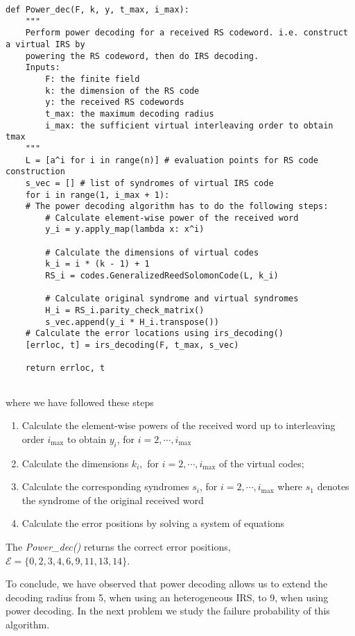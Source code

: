 \documentclass{article}
\begin{document}
\begin{verbatim}
def Power_dec(F, k, y, t_max, i_max):
    """
    Perform power decoding for a received RS codeword. i.e. construct a virtual IRS by
    powering the RS codeword, then do IRS decoding.
    Inputs:
        F: the finite field
        k: the dimension of the RS code
        y: the received RS codewords
        t_max: the maximum decoding radius
        i_max: the sufficient virtual interleaving order to obtain tmax
    """
    L = [a^i for i in range(n)] # evaluation points for RS code construction
    s_vec = [] # list of syndromes of virtual IRS code
    for i in range(1, i_max + 1):
    # The power decoding algorithm has to do the following steps:
        # Calculate element-wise power of the received word
        y_i = y.apply_map(lambda x: x^i)

        # Calculate the dimensions of virtual codes
        k_i = i * (k - 1) + 1
        RS_i = codes.GeneralizedReedSolomonCode(L, k_i)

        # Calculate original syndrome and virtual syndromes
        H_i = RS_i.parity_check_matrix()
        s_vec.append(y_i * H_i.transpose())
    # Calculate the error locations using irs_decoding()
    [errloc, t] = irs_decoding(F, t_max, s_vec)

    return errloc, t
   
\end{verbatim}

where we have followed these steps
\begin{enumerate}
\item Calculate the element-wise powers of the received word up to interleaving order $i_{\text{max}}$ to obtain $y_i$, for $i = 2, \cdots, i_{\text{max}}$
\item Calculate the dimensions $k_i,$ for $i = 2, \cdots, i_{\text{max}}$ of the virtual codes;
\item Calculate the corresponding syndromes $s_i$, for $i = 2, \cdots, i_{\text{max}}$ where $s_1$ denotes the syndrome of the original received word
\item Calculate the error positions by solving a system of equations
\end{enumerate}
The \textit{Power\_dec()} returns the correct error positions,  $\mathcal{E} = \{0, 2, 3, 4, 6, 9, 11, 13, 14\}$.

To conclude, we have observed that power decoding allows us to extend the decoding radius from 5, when using an heterogeneous IRS, to 9, when using power decoding. In the next problem we study the failure probability of this algorithm.
\end{document}
